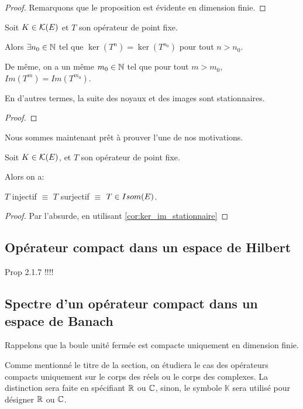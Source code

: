 \begin{proof}
	Remarquons que le proposition est évidente en dimension finie.
\end{proof}

\begin{corollary}
	\label{cor:ker_im_stationnaire}
	Soit $K \in \mathcal{K}(E)$ et $T$ son opérateur de point fixe.

	Alors $\exists n_{0} \in \mathbb{N}$ tel que $\ker(T^{n}) = \ker(T^{n_{0}})$
	pour tout $n > n_{0}$.

	De même, on a un même $m_{0} \in \mathbb{N}$ tel que pour tout $m > m_{0}$,
	$Im(T^{m}) = Im(T^{m_{0}})$.

	En d'autres termes, la suite des noyaux et des images sont stationnaires.
\end{corollary}

\begin{proof}

\end{proof}

Nous sommes maintenant prêt à prouver l'une de nos motivations.

\begin{proposition}
	\label{prop:equiv_inj_surj_bij}
	Soit $K \in \mathcal{K}(E)$, et $T$ son opérateur de point fixe.

	Alors on a:

	$T$ injectif $\equiv$ $T$ surjectif $\equiv$ $T \in Isom(E)$.
\end{proposition}

\begin{proof}
	Par l'absurde, en utilisant \ref{cor:ker_im_stationnaire}
\end{proof}

\subsection{Opérateur compact dans un espace de Hilbert}

Prop 2.1.7 !!!!

\subsection{Spectre d'un opérateur compact dans un espace de Banach}

Rappelons que la boule unité fermée est compacte uniquement en dimension finie.

Comme mentionné le titre de la section, on étudiera le cas des opérateurs
compacts uniquement sur le corps des réels ou le corps des complexes. La
distinction sera faite en spécifiant $\mathbb{R}$ ou $\mathbb{C}$, sinon, le symbole
$\mathbb{K}$ sera utilisé pour désigner $\mathbb{R}$ ou $\mathbb{C}$.

